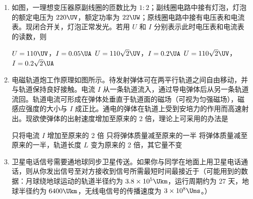 \documentclass[\gkver]{gaokaozhenti}
\begin{document}
\begin{enumerate}

\item
如图，一理想变压器原副线圈的匝数比为 $1:2$；副线圈电路中接有灯泡，灯泡的额定电压为 $220\UV$，额定功率为 $22\UW$；原线圈电路中接有电压表和电流表。现闭合开关，灯泡正常发光。若用 $U$ 和 $I$ 分别表示此时电压表和电流表的读数，则


{$U=110\UV$，$I=0.05\UA$}
{$U=110\sqrt{2}\UV$，$I=0.2\UA$}
{$U=110\sqrt{2}\UV$，$I=0.2\sqrt{2}\UA$}


\item
电磁轨道炮工作原理如图所示。待发射弹体可在两平行轨道之间自由移动，并与轨道保持良好接触。电流 $I$ 从一条轨道流入，通过导电弹体后从另一条轨道流回。轨道电流可形成在弹体处垂直于轨道面的磁场（可视为匀强磁场），磁感应强度的大小与 $I$ 成正比。通电的弹体在轨道上受到安培力的作用而高速射出。现欲使弹体的出射速度增加至原来的 2 倍，理论上可采用的办法是


{只将电流 $I$ 增加至原来的 2 倍}
{只将弹体质量减至原来的一半}
{将弹体质量减至原来的一半，轨道长度 $L$ 变为原来的 2 倍，其它量不变}


\item
卫星电话信号需要通地球同步卫星传送。如果你与同学在地面上用卫星电话通话，则从你发出信号至对方接收到信号所需最短时间最接近于（可能用到的数据：月球绕地球运动的轨道半径约为 $3.8\times10^{5}\Ukm$，运行周期约为 27 天，地球半径约为 $6400\Ukm$，无线电信号的传播速度为 $3\times10^{8}\Ums$。）


\end{enumerate}
\end{document}
